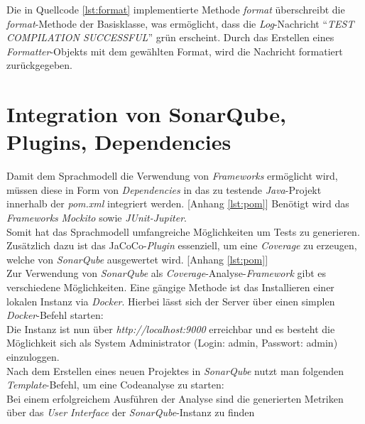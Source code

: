 Die in Quellcode \ref{lst:format} implementierte Methode \textit{format} überschreibt die \textit{format}-Methode der Basisklasse, was ermöglicht, dass die \textit{Log}-Nachricht ``\textit{TEST COMPILATION SUCCESSFUL}'' grün erscheint. Durch das Erstellen eines \textit{Formatter}-Objekts mit dem gewählten Format, wird die Nachricht formatiert zurückgegeben.\\
\vspace{-.3cm}

\section{Integration von SonarQube, Plugins, Dependencies}\label{sec:sonar}
Damit dem Sprachmodell die Verwendung von \textit{Frameworks} ermöglicht wird, müssen diese in Form von \textit{Dependencies} in das zu testende \textit{Java}-Projekt innerhalb der \textit{pom.xml} integriert werden. [Anhang \ref{lst:pom}] Benötigt wird das \textit{Frameworks} \textit{Mockito} sowie \textit{JUnit-Jupiter}.\\
Somit hat das Sprachmodell umfangreiche Möglichkeiten um Tests zu generieren. Zusätzlich dazu ist das JaCoCo-\textit{Plugin} essenziell, um eine \textit{Coverage} zu erzeugen, welche von \textit{SonarQube} ausgewertet wird. [Anhang \ref{lst:pom}]
\\Zur Verwendung von \textit{SonarQube} als \textit{Coverage}-Analyse-\textit{Framework} gibt es verschiedene Möglichkeiten. Eine gängige Methode ist das Installieren einer lokalen Instanz via \textit{Docker}. \cite*{TryOutSonarQube} Hierbei lässt sich der Server über einen simplen \textit{Docker}-Befehl starten:\\[-.2cm]
\vspace{-.3cm} Die Instanz ist nun über \textit{http://localhost:9000} erreichbar und es besteht die Möglichkeit sich als System Administrator (Login: admin, Passwort: admin) einzuloggen.\\ Nach dem Erstellen eines neuen Projektes in \textit{SonarQube} nutzt man folgenden \textit{Template}-Befehl, um eine Codeanalyse zu starten:\\[-.2cm]
\vspace{-.3cm}
Bei einem erfolgreichem Ausführen der Analyse sind die generierten Metriken über das \textit{User Interface} der \textit{SonarQube}-Instanz zu finden

